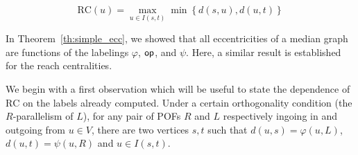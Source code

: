 \documentclass{article}
\newcommand{\set}[1]{\left\{ #1 \right\}}
\newcommand{\opp}{\mbox{\textsf{op}}}
\newcommand{\rc}{\mbox{RC}}
\begin{document}
\begin{equation}
\rc(u) = \max_{u \in I(s,t)} \min \set{d(s,u),d(u,t)}
\label{eq:reach_centrality}
\end{equation}

In Theorem~\ref{th:simple_ecc}, we showed that all eccentricities of a median graph are functions of the labelings $\varphi$, $\opp$, and $\psi$. Here, a similar result is established for the reach centralities.

We begin with a first observation which will be useful to state the dependence of $\rc$ on the labels already computed. Under a certain orthogonality condition (the $R$-parallelism of $L$), for any pair of POFs $R$ and $L$ respectively ingoing in and outgoing from $u \in V$, there are two vertices $s,t$ such that $d(u,s) = \varphi(u,L)$, $d(u,t) = \psi(u,R)$ and $u \in I(s,t)$.
\end{document}

